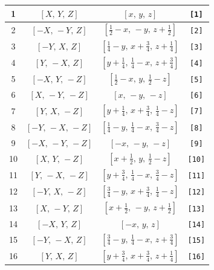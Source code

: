 \documentclass[fleqn,8pt]{jsarticle}
\begin{document}
\begin{longtable}{cccc}
1 & $\left[ X,\, Y,\, Z \right]$ & $\left[ x,\, y,\, z \right]$ & {\tt [1]} \\ \hline
2 & $\left[ - X,\, - Y,\, Z \right]$ & $\left[ \frac{1}{2} - x,\, - y,\, z + \frac{1}{2} \right]$ & {\tt [2]} \\ \hline
3 & $\left[ - Y,\, X,\, Z \right]$ & $\left[ \frac{1}{4} - y,\, x + \frac{3}{4},\, z + \frac{1}{4} \right]$ & {\tt [3]} \\ \hline
4 & $\left[ Y,\, - X,\, Z \right]$ & $\left[ y + \frac{1}{4},\, \frac{1}{4} - x,\, z + \frac{3}{4} \right]$ & {\tt [4]} \\ \hline
5 & $\left[ - X,\, Y,\, - Z \right]$ & $\left[ \frac{1}{2} - x,\, y,\, \frac{1}{2} - z \right]$ & {\tt [5]} \\ \hline
6 & $\left[ X,\, - Y,\, - Z \right]$ & $\left[ x,\, - y,\, - z \right]$ & {\tt [6]} \\ \hline
7 & $\left[ Y,\, X,\, - Z \right]$ & $\left[ y + \frac{1}{4},\, x + \frac{3}{4},\, \frac{1}{4} - z \right]$ & {\tt [7]} \\ \hline
8 & $\left[ - Y,\, - X,\, - Z \right]$ & $\left[ \frac{1}{4} - y,\, \frac{1}{4} - x,\, \frac{3}{4} - z \right]$ & {\tt [8]} \\ \hline
9 & $\left[ - X,\, - Y,\, - Z \right]$ & $\left[ - x,\, - y,\, - z \right]$ & {\tt [9]} \\ \hline
10 & $\left[ X,\, Y,\, - Z \right]$ & $\left[ x + \frac{1}{2},\, y,\, \frac{1}{2} - z \right]$ & {\tt [10]} \\ \hline
11 & $\left[ Y,\, - X,\, - Z \right]$ & $\left[ y + \frac{3}{4},\, \frac{1}{4} - x,\, \frac{3}{4} - z \right]$ & {\tt [11]} \\ \hline
12 & $\left[ - Y,\, X,\, - Z \right]$ & $\left[ \frac{3}{4} - y,\, x + \frac{3}{4},\, \frac{1}{4} - z \right]$ & {\tt [12]} \\ \hline
13 & $\left[ X,\, - Y,\, Z \right]$ & $\left[ x + \frac{1}{2},\, - y,\, z + \frac{1}{2} \right]$ & {\tt [13]} \\ \hline
14 & $\left[ - X,\, Y,\, Z \right]$ & $\left[ - x,\, y,\, z \right]$ & {\tt [14]} \\ \hline
15 & $\left[ - Y,\, - X,\, Z \right]$ & $\left[ \frac{3}{4} - y,\, \frac{1}{4} - x,\, z + \frac{3}{4} \right]$ & {\tt [15]} \\ \hline
16 & $\left[ Y,\, X,\, Z \right]$ & $\left[ y + \frac{3}{4},\, x + \frac{3}{4},\, z + \frac{1}{4} \right]$ & {\tt [16]} \\
\end{longtable}
\end{document}
